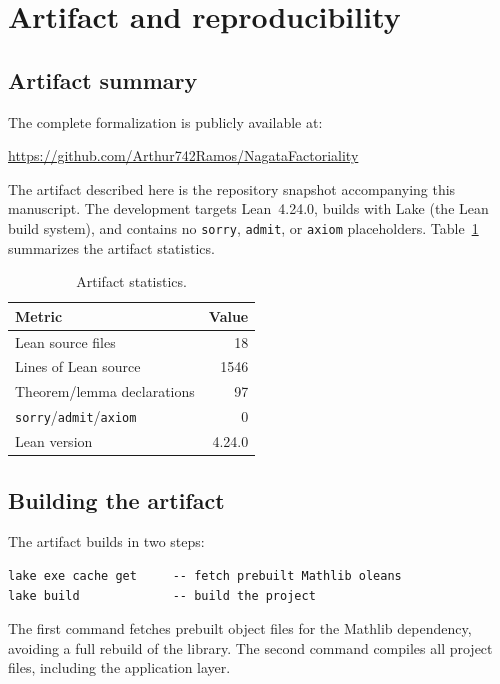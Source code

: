 \documentclass[11pt]{article}
\theoremstyle{plain}
\theoremstyle{definition}
\theoremstyle{remark}
\newcommand{\li}[1]{\texorpdfstring{\texttt{#1}}{#1}}
\begin{document}
\section{Artifact and reproducibility}\label{sec:artifact}

\subsection{Artifact summary}

The complete formalization is publicly available at:
\begin{center}
\url{https://github.com/Arthur742Ramos/NagataFactoriality}
\end{center}
The artifact described here is the repository snapshot accompanying this
manuscript.  The development targets Lean~4.24.0, builds with Lake (the Lean
build system), and contains no \li{sorry}, \li{admit}, or \li{axiom}
placeholders.
Table~\ref{tab:stats} summarizes the artifact statistics.

\begin{table}[ht]
\centering
\caption{Artifact statistics.}\label{tab:stats}
\smallskip
\begin{tabular}{@{}lr@{}}
\toprule
\textbf{Metric} & \textbf{Value} \\
\midrule
Lean source files              & 18   \\
Lines of Lean source           & 1546 \\
Theorem/lemma declarations     & 97   \\
\li{sorry}/\li{admit}/\li{axiom} & 0   \\
Lean version                   & 4.24.0 \\
\bottomrule
\end{tabular}
\end{table}

\subsection{Building the artifact}

The artifact builds in two steps:
\begin{lstlisting}[style=lean]
lake exe cache get     -- fetch prebuilt Mathlib oleans
lake build             -- build the project
\end{lstlisting}
The first command fetches prebuilt object files for the Mathlib dependency,
avoiding a full rebuild of the library.  The second command compiles all
project files, including the application layer.
\end{document}
